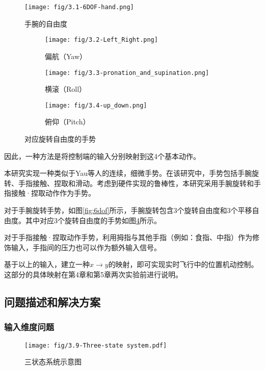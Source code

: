 \begin{figure}[t]
    \vspace{-20pt}
    \centering
    \texttt{[image: fig/3.1-6DOF-hand.png]}
    \caption{手腕的自由度}
    \label{fig:6dof}

    \centering
    \begin{subfigure}[b]{0.3\textwidth}
        \texttt{[image: fig/3.2-Left\_Right.png]}
        \caption{偏航（Yaw）}
        \label{fig:yaw}
    \end{subfigure}
    \hfill
    \begin{subfigure}[b]{0.3\textwidth}
        \texttt{[image: fig/3.3-pronation\_and\_supination.png]}
        \caption{横滚（Roll）}
        \label{fig:roll}
    \end{subfigure}
    \hfill
    \begin{subfigure}[b]{0.3\textwidth}
        \texttt{[image: fig/3.4-up\_down.png]}
        \caption{俯仰（Pitch）}
        \label{fig:pitch}
    \end{subfigure}
    \caption{对应旋转自由度的手势}
    \label{fig:three-guesture}
\end{figure}

\clearpage
因此，一种方法是将控制端的输入分别映射到这4个基本动作。

本研究实现一种类似于Yau等人\cites{yau2020subtle}的连续，细微手势。在该研究中，手势包括手腕旋转、手指接触、捏取和滑动。考虑到硬件实现的鲁棒性，本研究采用手腕旋转和手指接触·捏取动作作为手势。

对于手腕旋转手势，如图\ref{fig:6dof}所示，手腕旋转包含3个旋转自由度和3个平移自由度。其中对应3个旋转自由度的手势如图\ref{fig:three-guesture}所示。

对于手指接触·捏取动作手势，利用拇指与其他手指（例如：食指、中指）作为修饰输入，手指间的压力也可以作为额外输入信号。

基于以上的输入，建立一种$x\xrightarrow{} y$的映射，即可实现实时飞行中的位置机动控制。这部分的具体映射在第4章和第5章两次实验前进行说明。

\subsection{问题描述和解决方案}

\subsubsection{输入维度问题}
\begin{figure}[t]
	\centering
	\texttt{[image: fig/3.9-Three-state system.pdf]}
	\caption{三状态系统示意图}
	\label{fig:3.9-Three-state}
\end{figure}

